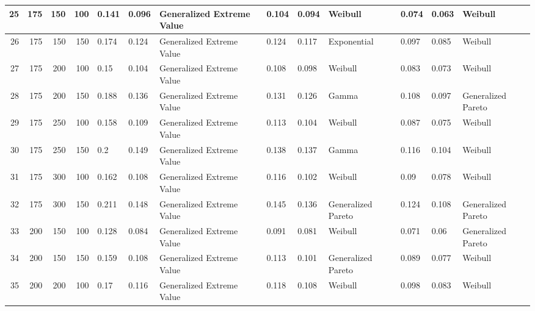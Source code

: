 \begin{table}[H]
{{\begin{tabular}{|r|r|r|r|l|l|l|l|l|l|l|l|l|}
    25 & 175 & 150 & 100 & \cellcolor[HTML]{606BA3}0.141 & \cellcolor[HTML]{606FA3}0.096 & Generalized Extreme Value & 0.104 & 0.094 & Weibull            & 0.074 & 0.063 & Weibull            \\ \hline
    26 & 175 & 150 & 150 & \cellcolor[HTML]{64B0AC}0.174 & \cellcolor[HTML]{65BBAD}0.124 & Generalized Extreme Value & 0.124 & 0.117 & Exponential        & 0.097 & 0.085 & Weibull            \\ \hline
    27 & 175 & 200 & 100 & \cellcolor[HTML]{617DA5}0.15  & \cellcolor[HTML]{6184A6}0.104 & Generalized Extreme Value & 0.108 & 0.098 & Weibull            & 0.083 & 0.073 & Weibull            \\ \hline
    28 & 175 & 200 & 150 & \cellcolor[HTML]{79C8B0}0.188 & \cellcolor[HTML]{8CD0B1}0.136 & Generalized Extreme Value & 0.131 & 0.126 & Gamma              & 0.108 & 0.097 & Generalized Pareto \\ \hline
    29 & 175 & 250 & 100 & \cellcolor[HTML]{628FA7}0.158 & \cellcolor[HTML]{6292A8}0.109 & Generalized Extreme Value & 0.113 & 0.104 & Weibull            & 0.087 & 0.075 & Weibull            \\ \hline
    30 & 175 & 250 & 150 & \cellcolor[HTML]{9BD6B3}0.2   & \cellcolor[HTML]{BDE4B5}0.149 & Generalized Extreme Value & 0.138 & 0.137 & Gamma              & 0.116 & 0.104 & Weibull            \\ \hline
    31 & 175 & 300 & 100 & \cellcolor[HTML]{6297A9}0.162 & \cellcolor[HTML]{6290A8}0.108 & Generalized Extreme Value & 0.116 & 0.102 & Weibull            & 0.09  & 0.078 & Weibull            \\ \hline
    32 & 175 & 300 & 150 & \cellcolor[HTML]{BBE3B5}0.211 & \cellcolor[HTML]{BBE3B5}0.148 & Generalized Extreme Value & 0.145 & 0.136 & Generalized Pareto & 0.124 & 0.108 & Generalized Pareto \\ \hline
    33 & 200 & 150 & 100 & \cellcolor[HTML]{5E4F9F}0.128 & \cellcolor[HTML]{5E4F9F}0.084 & Generalized Extreme Value & 0.091 & 0.081 & Weibull            & 0.071 & 0.06  & Generalized Pareto \\ \hline
    34 & 200 & 150 & 150 & \cellcolor[HTML]{6290A8}0.159 & \cellcolor[HTML]{628FA7}0.108 & Generalized Extreme Value & 0.113 & 0.101 & Generalized Pareto & 0.089 & 0.077 & Weibull            \\ \hline
    35 & 200 & 200 & 100 & \cellcolor[HTML]{63A7AB}0.17  & \cellcolor[HTML]{63A4AA}0.116 & Generalized Extreme Value & 0.118 & 0.108 & Weibull            & 0.098 & 0.083 & Weibull            \\ \hline

\end{tabular}}}
\end{table}
